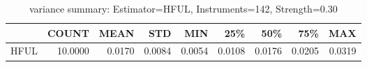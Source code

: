 \begin{table}[ht]
\centering
\caption{variance summary: Estimator=HFUL, Instruments=142, Strength=0.30}
\begin{tabular}{lrrrrrrrr}
\toprule
 & COUNT & MEAN & STD & MIN & 25\% & 50\% & 75\% & MAX \\
\midrule
HFUL & 10.0000 & 0.0170 & 0.0084 & 0.0054 & 0.0108 & 0.0176 & 0.0205 & 0.0319 \\
\bottomrule
\end{tabular}
\end{table}
